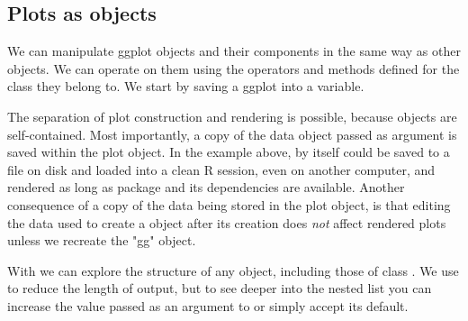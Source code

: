 \documentclass[krantz2]{krantz}\usepackage{knitr}
\begin{document}
\subsection{Plots as \Rlang objects}
We can manipulate ggplot objects and their components in the same way as other \Rlang objects. We can operate on them using the operators and methods defined for the  class they belong to. We start by saving a ggplot into a variable.

\begin{knitrout}\footnotesize
{}\color{fgcolor}\begin{kframe}
\begin{alltt}
 \hlkwb{<-} \hlstd{(} 
       \hlstd{(}    \hlopt{+}
  \hlstd{()}
\end{alltt}
\end{kframe}
\end{knitrout}

\begin{warningbox}
  The separation of plot construction and rendering is possible, because  objects are self-contained. Most importantly, a copy of the data object passed as argument is saved within the plot object. In the example above,  by itself could be saved to a file on disk and loaded into a clean R session, even on another computer, and rendered as long as package \ggplot and its dependencies are available. Another consequence of a copy of the data being stored in the plot object, is that editing the data used to create a  object after its creation does \emph{not} affect rendered plots unless we recreate the "gg" object.

  With  we can explore the structure of any \Rlang object, including those of class . We use  to reduce the length of output, but to see deeper into the nested list you can increase the value passed as an argument to  or simply accept its default.

\begin{knitrout}\footnotesize
{}\color{fgcolor}\begin{kframe}
\begin{alltt}
  \hlstd{=} \hlstd{)}
\end{alltt}
\end{kframe}
\end{knitrout}
\end{warningbox}
\end{document}
